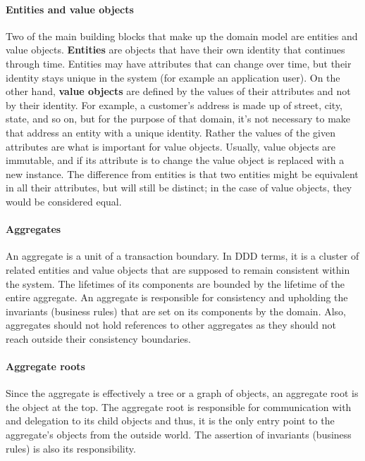 \documentclass{book}
\begin{document}
\paragraph{Entities and value objects}\label{entities-and-value-objects}

Two of the main building blocks that make up the domain model are
entities and value objects. \textbf{Entities} are objects that have
their own identity that continues through time. Entities may have
attributes that can change over time, but their identity stays unique in
the system (for example an application user). On the other hand,
\textbf{value objects} are defined by the values of their attributes and
not by their identity. For example, a customer's address is made up of
street, city, state, and so on, but for the purpose of that domain, it's
not necessary to make that address an entity with a unique identity.
Rather the values of the given attributes are what is important for
value objects. Usually, value objects are immutable, and if its
attribute is to change the value object is replaced with a new instance.
The difference from entities is that two entities might be equivalent in
all their attributes, but will still be distinct; in the case of value
objects, they would be considered equal.

\paragraph{Aggregates}\label{aggregates}

An aggregate is a unit of a transaction boundary. In DDD terms, it is a
cluster of related entities and value objects that are supposed to
remain consistent within the system. The lifetimes of its components are
bounded by the lifetime of the entire aggregate. An aggregate is
responsible for consistency and upholding the invariants (business
rules) that are set on its components by the domain. Also, aggregates
should not hold references to other aggregates as they should not reach
outside their consistency boundaries.

\paragraph{Aggregate roots}\label{aggregate-roots}

Since the aggregate is effectively a tree or a graph of objects, an
aggregate root is the object at the top. The aggregate root is
responsible for communication with and delegation to its child objects
and thus, it is the only entry point to the aggregate's objects from the
outside world. The assertion of invariants (business rules) is also its
responsibility.
\end{document}
